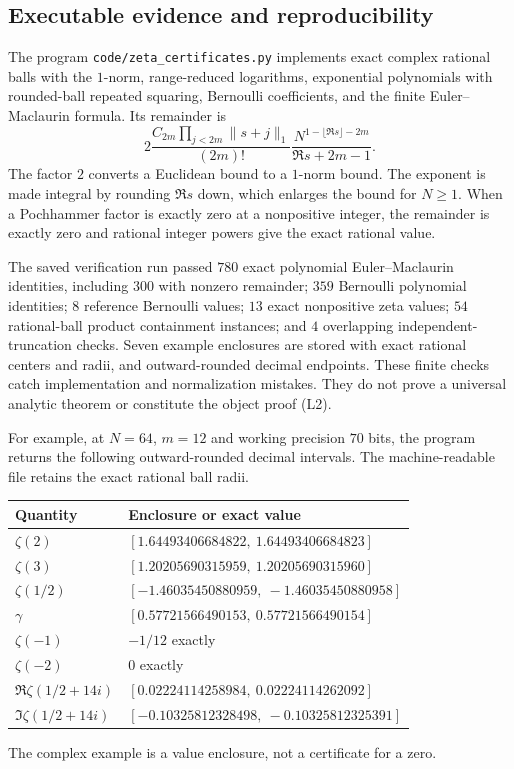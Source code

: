 \subsection{Executable evidence and reproducibility}
The program \texttt{code/zeta\_certificates.py} implements exact complex
rational balls with the $1$-norm, range-reduced logarithms, exponential
polynomials with rounded-ball repeated squaring, Bernoulli coefficients,
and the finite Euler--Maclaurin formula. Its remainder is
\[
 2\frac{C_{2m}\prod_{j<2m}\|s+j\|_1}{(2m)!}
       \frac{N^{1-\lfloor\Re s\rfloor-2m}}{\Re s+2m-1}.
 \tag{L3}\label{eq:code-remainder}
\]
The factor $2$ converts a Euclidean bound to a $1$-norm bound.
The exponent is made integral by rounding $\Re s$ down, which enlarges
the bound for $N\ge1$. When a Pochhammer factor is exactly zero at a
nonpositive integer, the remainder is exactly zero and rational integer
powers give the exact rational value.

The saved verification run passed $780$ exact polynomial
Euler--Maclaurin identities, including $300$ with nonzero remainder;
$359$ Bernoulli polynomial identities; $8$ reference Bernoulli values;
$13$ exact nonpositive zeta values; $54$ rational-ball product
containment instances; and $4$ overlapping independent-truncation checks.
Seven example enclosures are stored with exact rational centers and
radii, and outward-rounded decimal endpoints. These finite checks catch
implementation and normalization mistakes. They do not prove a
universal analytic theorem or constitute the object proof (L2).

For example, at $N=64$, $m=12$ and working precision $70$ bits,
the program returns the following outward-rounded decimal intervals.
The machine-readable file retains the exact rational ball radii.
\begin{center}
\small
\begin{tabular}{ll}
\toprule Quantity & Enclosure or exact value\\\midrule
$\zeta(2)$ & $[1.64493406684822,\ 1.64493406684823]$\\
$\zeta(3)$ & $[1.20205690315959,\ 1.20205690315960]$\\
$\zeta(1/2)$ & $[-1.46035450880959,\ -1.46035450880958]$\\
$\gamma$ & $[0.57721566490153,\ 0.57721566490154]$\\
$\zeta(-1)$ & $-1/12$ exactly\\
$\zeta(-2)$ & $0$ exactly\\
$\Re\zeta(1/2+14i)$ & $[0.02224114258984,\ 0.02224114262092]$\\
$\Im\zeta(1/2+14i)$ & $[-0.10325812328498,\ -0.10325812325391]$\\
\bottomrule
\end{tabular}
\end{center}
The complex example is a value enclosure, not a certificate for a zero.

